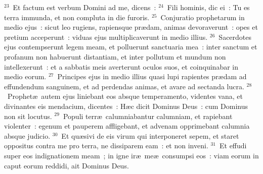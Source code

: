 ${}^{23}$~Et factum est verbum Domini ad me, dicens~:
${}^{24}$~Fili hominis, dic ei~: Tu es terra immunda, et non compluta in die furoris.
${}^{25}$~Conjuratio prophetarum in medio ejus~: sicut leo rugiens, rapiensque pr\ae dam, animas devoraverunt~: opes et pretium acceperunt~: viduas ejus multiplicaverunt in medio illius.
${}^{26}$~Sacerdotes ejus contempserunt legem meam, et polluerunt sanctuaria mea~: inter sanctum et profanum non habuerunt distantiam, et inter pollutum et mundum non intellexerunt~: et a sabbatis meis averterunt oculos suos, et coinquinabar in medio eorum.
${}^{27}$~Principes ejus in medio illius quasi lupi rapientes pr\ae dam ad effundendum sanguinem, et ad perdendas animas, et avare ad sectanda lucra.
${}^{28}$~Prophet\ae\ autem ejus liniebant eos absque temperamento, videntes vana, et divinantes eis mendacium, dicentes~: H\ae c dicit Dominus Deus~: cum Dominus non sit locutus.
${}^{29}$~Populi terr\ae\ calumniabantur calumniam, et rapiebant violenter~: egenum et pauperem affligebant, et advenam opprimebant calumnia absque judicio.
${}^{30}$~Et qu\ae sivi de eis virum qui interponeret sepem, et staret oppositus contra me pro terra, ne dissiparem eam~: et non inveni.
${}^{31}$~Et effudi super eos indignationem meam~; in igne ir\ae\ me\ae\ consumpsi eos~: viam eorum in caput eorum reddidi, ait Dominus Deus.

